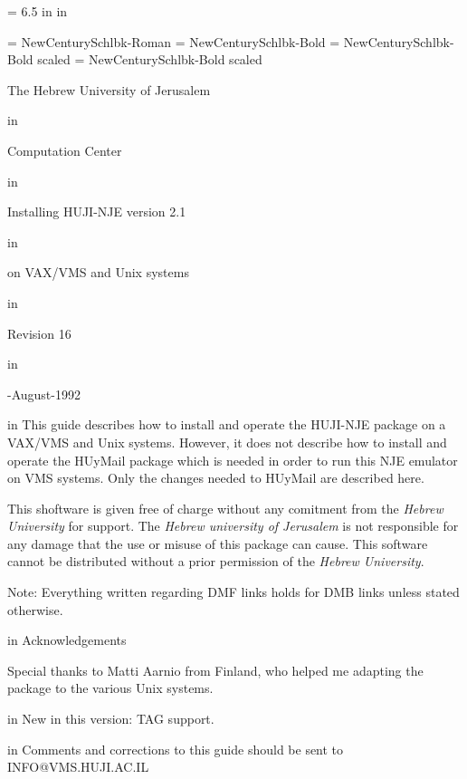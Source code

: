 %
\hsize = 6.5 in
 in

\font\ncr = NewCenturySchlbk-Roman
\font\ncrBold = NewCenturySchlbk-Bold
\font\ncrMed = NewCenturySchlbk-Bold scaled 
\font\ncrBig = NewCenturySchlbk-Bold scaled 



\centerline{\ncrBig The Hebrew University of Jerusalem}

 in
\centerline{\ncrBig Computation Center}


 in
\centerline{\ncrMed Installing HUJI-NJE version 2.1}

 in
\centerline{\ncrMed on VAX/VMS and Unix systems}

 in
\centerline{\ncrBold Revision 16}

 in
\centerline{-August-1992}

 in
This  guide describes how to install and operate the HUJI-NJE package
on a VAX/VMS and Unix systems. However, it  does  not  describe  how  to
install  and operate the HUyMail package which is needed in order to run
this NJE emulator on VMS systems.
Only the changes  needed  to  HUyMail  are  described here.

This shoftware is given free of charge without any comitment from the
{\sl Hebrew
University} for support. The {\sl Hebrew university of Jerusalem} is not
responsible
for any damage that the use or misuse of this package can cause. This software
cannot be distributed without a prior permission of the {\sl Hebrew University}.

Note:  Everything written regarding DMF links holds for DMB links unless
stated otherwise.

 in
{\ncrMed Acknowledgements}

Special thanks to Matti Aarnio from Finland, who helped  me  adapting
the package to the various Unix systems.

 in
New in this version: TAG support.

 in
{\ncrBold Comments and corrections to this guide should be sent to
INFO@VMS.HUJI.AC.IL}

\vfill\eject

